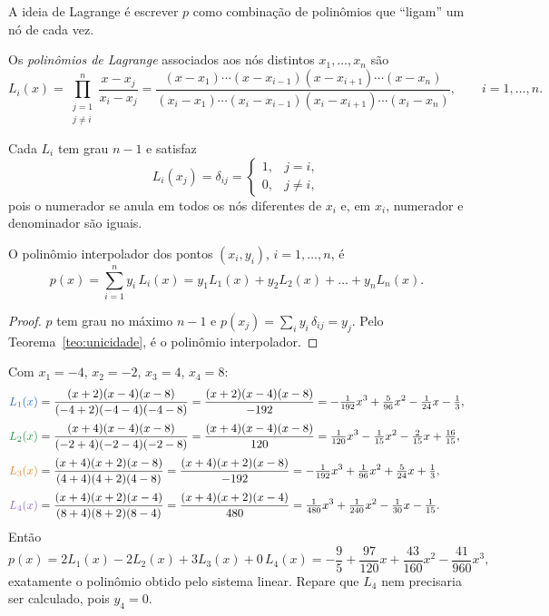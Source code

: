 A ideia de Lagrange é escrever $p$ como combinação de polinômios que ``ligam'' um nó
de cada vez.

\begin{definicao}
Os \emph{polinômios de Lagrange} associados aos nós distintos $x_1,\dots,x_n$ são
\[
L_i(x)=\prod_{\substack{j=1\\ j\neq i}}^{n}\frac{x-x_j}{x_i-x_j}
=\frac{(x-x_1)\cdots(x-x_{i-1})(x-x_{i+1})\cdots(x-x_n)}
{(x_i-x_1)\cdots(x_i-x_{i-1})(x_i-x_{i+1})\cdots(x_i-x_n)},
\qquad i=1,\dots,n.
\]
\end{definicao}

Cada $L_i$ tem grau $n-1$ e satisfaz
\[
L_i(x_j)=\delta_{ij}=\begin{cases}1,& j=i,\\ 0,& j\neq i,\end{cases}
\]
pois o numerador se anula em todos os nós diferentes de $x_i$ e, em $x_i$, numerador e
denominador são iguais.

\begin{teorema}
O polinômio interpolador dos pontos $(x_i,y_i)$, $i=1,\dots,n$, é
\[
p(x)=\sum_{i=1}^{n}y_i\,L_i(x)=y_1L_1(x)+y_2L_2(x)+\dots+y_nL_n(x).
\]
\end{teorema}

\begin{proof}
$p$ tem grau no máximo $n-1$ e $p(x_j)=\sum_i y_i\,\delta_{ij}=y_j$. Pelo
Teorema~\ref{teo:unicidade}, é o polinômio interpolador.
\end{proof}

\begin{exemplo}
Com $x_1=-4$, $x_2=-2$, $x_3=4$, $x_4=8$:
\begin{align*}
{\color{cL1}L_1(x)}&=\frac{(x+2)(x-4)(x-8)}{(-4+2)(-4-4)(-4-8)}=\frac{(x+2)(x-4)(x-8)}{-192}
=-\tfrac{1}{192}x^3+\tfrac{5}{96}x^2-\tfrac{1}{24}x-\tfrac13,\\[2pt]
{\color{cL2}L_2(x)}&=\frac{(x+4)(x-4)(x-8)}{(-2+4)(-2-4)(-2-8)}=\frac{(x+4)(x-4)(x-8)}{120}
=\tfrac{1}{120}x^3-\tfrac{1}{15}x^2-\tfrac{2}{15}x+\tfrac{16}{15},\\[2pt]
{\color{cL3}L_3(x)}&=\frac{(x+4)(x+2)(x-8)}{(4+4)(4+2)(4-8)}=\frac{(x+4)(x+2)(x-8)}{-192}
=-\tfrac{1}{192}x^3+\tfrac{1}{96}x^2+\tfrac{5}{24}x+\tfrac13,\\[2pt]
{\color{cL4}L_4(x)}&=\frac{(x+4)(x+2)(x-4)}{(8+4)(8+2)(8-4)}=\frac{(x+4)(x+2)(x-4)}{480}
=\tfrac{1}{480}x^3+\tfrac{1}{240}x^2-\tfrac{1}{30}x-\tfrac{1}{15}.
\end{align*}
Então
\[
p(x)=2L_1(x)-2L_2(x)+3L_3(x)+0\,L_4(x)
=-\frac95+\frac{97}{120}x+\frac{43}{160}x^2-\frac{41}{960}x^3,
\]
exatamente o polinômio obtido pelo sistema linear. Repare que $L_4$ nem precisaria ser
calculado, pois $y_4=0$.
\end{exemplo}

